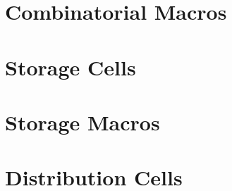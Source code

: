 



\chapter{Combinatorial Macros}
\clearpage




\chapter{Storage Cells}
\clearpage





\chapter{Storage Macros}
\clearpage




\chapter{Distribution Cells}
\clearpage








